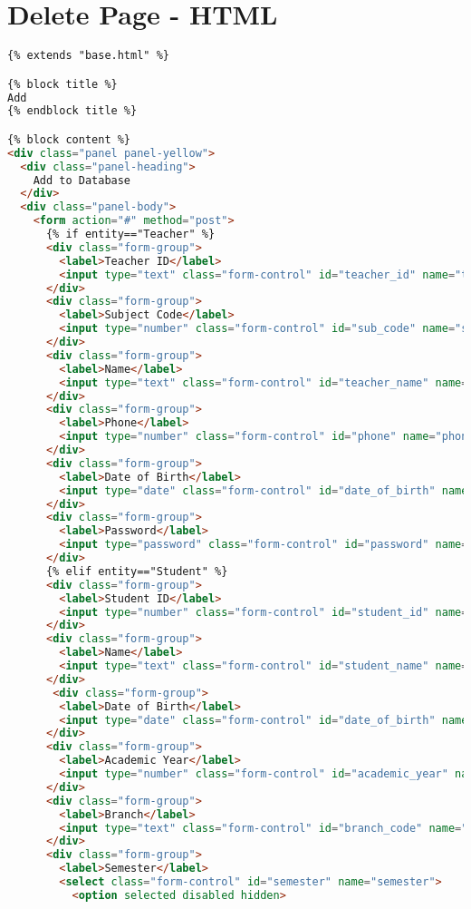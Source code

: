 \section{Delete Page - HTML}
\begin{lstlisting}[language=HTML]
{% extends "base.html" %}

{% block title %}
Add
{% endblock title %}

{% block content %}
<div class="panel panel-yellow">
  <div class="panel-heading">
    Add to Database
  </div>
  <div class="panel-body">
    <form action="#" method="post">
      {% if entity=="Teacher" %}
      <div class="form-group">
        <label>Teacher ID</label>
        <input type="text" class="form-control" id="teacher_id" name="teacher_id">
      </div>
      <div class="form-group">
        <label>Subject Code</label>
        <input type="number" class="form-control" id="sub_code" name="sub_code">
      </div>
      <div class="form-group">
        <label>Name</label>
        <input type="text" class="form-control" id="teacher_name" name="teacher_name">
      </div>
      <div class="form-group">
        <label>Phone</label>
        <input type="number" class="form-control" id="phone" name="phone">
      </div>
      <div class="form-group">
        <label>Date of Birth</label>
        <input type="date" class="form-control" id="date_of_birth" name="date_of_birth">
      </div>
      <div class="form-group">
        <label>Password</label>
        <input type="password" class="form-control" id="password" name="password">
      </div>
      {% elif entity=="Student" %}
      <div class="form-group">
        <label>Student ID</label>
        <input type="number" class="form-control" id="student_id" name="student_id">
      </div>
      <div class="form-group">
        <label>Name</label>
        <input type="text" class="form-control" id="student_name" name="student_name">
      </div>
       <div class="form-group">
        <label>Date of Birth</label>
        <input type="date" class="form-control" id="date_of_birth" name="date_of_birth">
      </div>
      <div class="form-group">
        <label>Academic Year</label>
        <input type="number" class="form-control" id="academic_year" name="academic_year">
      </div>
      <div class="form-group">
        <label>Branch</label>
        <input type="text" class="form-control" id="branch_code" name="branch_code">
      </div>
      <div class="form-group">
        <label>Semester</label>
        <select class="form-control" id="semester" name="semester">
          <option selected disabled hidden>

\end{lstlisting}
